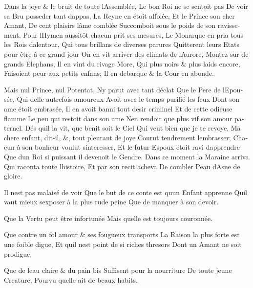 \documentclass[14pt,a4paper]{memoir}
\begin{document}
\begin{otherlanguage}{french}
{Dans la joye \& le bruit de toute l\textquotesingle Assemblée, } {Le
bon Roi ne se sentoit pas} {De voir sa Bru posseder tant
d\textquotesingle appas,} {La Reyne en étoit affolée,} {Et le Prince son
cher Amant,} {De cent plaisirs l\textquotesingle âme comblée}
{Succomboit sous le poids de son ravissement.} {Pour
l\textquotesingle Hymen aussitôt chacun prit ses mesures,} {Le Monarque
en pria tous les Rois d\textquotesingle alentour,} {Qui tous brillans de
diverses parures} {Quitterent leurs Etats pour être à ce-grand jour }
{On en vit arriver des climats de l\textquotesingle Aurore,} {Montez sur
de grands Elephans,} {Il en vint du rivage More,} {Qui plus noirs \&
plus laids encore,} {Faisoient peur aux petits enfans;} {Il en debarque
\& la Cour en abonde.}

{Mais nul Prince, nul Potentat,} {N\textquotesingle y parut avec tant
d\textquotesingle éclat} {Que le Pere de l\textquotesingle Epousée,}
{Qui d\textquotesingle elle autrefois amoureux} {Avoit avec le temps
purifié les feux} {Dont son ame étoit embrasée,} {Il en avoit banni tout
desir criminel} {Et de cette odieuse flamme} {Le peu qui restoit dans
son ame} {N\textquotesingle en rendoit que plus vif son amour paternel.}
{Dés qu\textquotesingle il la vit, que benit soit le Ciel} {Qui veut
bien que je te revoye,} {Ma chere enfant, dit-il, \&, tout pleurant de
joye } {Courut tendrement l\textquotesingle embrasser;} {Chacun à son
bonheur voulut s\textquotesingle interesser,} {Et le futur Espoux étoit
ravi d\textquotesingle apprendre} {Que d\textquotesingle un Roi si
puissant il devenoit le Gendre. } {Dans ce moment la Maraine arriva}
{Qui raconta toute l\textquotesingle histoire,} {Et par son recit
acheva} {De combler Peau d\textquotesingle Asne de gloire.}

{Il n\textquotesingle est pas malaisé de voir} {Que le but de ce conte
est qu\textquotesingle un Enfant apprenne } {Qu\textquotesingle il vaut
mieux s\textquotesingle exposer à la plus rude peine } {Que de manquer à
son devoir.}

{Que la Vertu peut être infortunée} {Mais qu\textquotesingle elle est
toujours couronnée.}

{Que contre un fol amour \& ses fougueux transports} {La Raison la plus
forte est une foible digue,} {Et qu\textquotesingle il
n\textquotesingle est point de si riches thresors} {Dont un Amant ne
soit prodigue.}

{Que de l\textquotesingle eau claire \& du pain bis} {Suffisent pour la
nourriture} {De toute jeune Creature,} {Pourvu qu\textquotesingle elle
ait de beaux habits.}


\end{otherlanguage}
\end{document}
